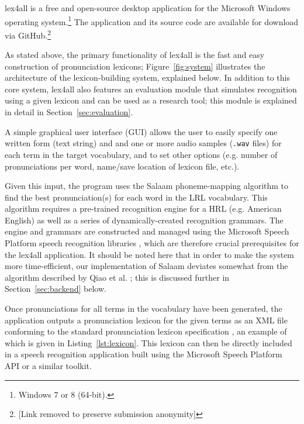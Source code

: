 \documentclass[11pt]{article}
\begin{document}
lex4all is a free and open-source desktop application for the Microsoft Windows operating system.\footnote{Windows 7 or 8 (64-bit).}  The application and its source code are available for download via GitHub.\footnote{[Link removed to preserve submission anonymity]}

As stated above, the primary functionality of lex4all is the fast and easy construction of pronunciation lexicons; Figure~\ref{fig:system} illustrates the architecture of the lexicon-building system, explained below. In addition to this core system, lex4all also features an evaluation module that simulates recognition using a given lexicon and can be used as a research tool; this module is explained in detail in Section~\ref{sec:evaluation}.

A simple graphical user interface (GUI) allows the user to easily specify one written form (text string) and and one or more audio samples (\texttt{.wav} files) for each term in the target vocabulary, and to set other options (e.g. number of pronunciations per word, name/save location of lexicon file, etc.). 

Given this input, the program uses the Salaam phoneme-mapping algorithm \cite{Qiao10,Chan12} to find the best pronunciation(s) for each word in the LRL vocabulary. This algorithm requires a pre-trained recognition engine for a HRL (e.g. American English) as well as a series of dynamically-created recognition grammars. The engine and grammars are constructed and managed using the Microsoft Speech Platform speech recognition libraries \cite{mspsdk}, which are therefore crucial prerequisites for the lex4all application. It should be noted here that in order to make the system more time-efficient, our implementation of Salaam deviates somewhat from the algorithm described by Qiao et al. ; this is discussed further in Section~\ref{sec:backend} below. 

Once pronunciations for all terms in the vocabulary have been generated, the application outputs a pronunciation lexicon for the given terms as an XML file conforming to the standard pronunciation lexicon specification \cite{pls}, an example of which is given in Listing~\ref{lst:lexicon}. This lexicon can then be directly included in a speech recognition application built using the Microsoft Speech Platform API or a similar toolkit.




\end{document}
